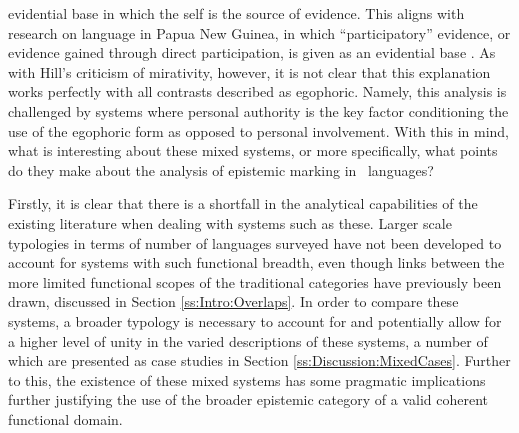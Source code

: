 evidential base in which the self is the source of evidence. This aligns with research on language in Papua New Guinea, in which ``participatory'' evidence, or evidence gained through direct participation, is given as an evidential base \cite{SanRoque2012}. As with Hill's criticism of mirativity, however, it is not clear that this explanation works perfectly with all contrasts described as egophoric. Namely, this analysis is challenged by systems where personal authority is the key factor conditioning the use of the egophoric form as opposed to personal involvement. With this in mind, what is interesting about these mixed systems, or more specifically, what points do they make about the analysis of epistemic marking in \lfam\ languages?

Firstly, it is clear that there is a shortfall in the analytical capabilities of the existing literature when dealing with systems such as these. Larger scale typologies in terms of number of languages surveyed have not been developed to account for systems with such functional breadth, even though links between the more limited functional scopes of the traditional categories have previously been drawn, discussed in Section \ref{ss:Intro:Overlaps}. In order to compare these systems, a broader typology is necessary to account for and potentially allow for a higher level of unity in the varied descriptions of these systems, a number of which are presented as case studies in Section \ref{ss:Discussion:MixedCases}. Further to this, the existence of these mixed systems has some pragmatic implications further justifying the use of the broader epistemic category of a valid coherent functional domain.

